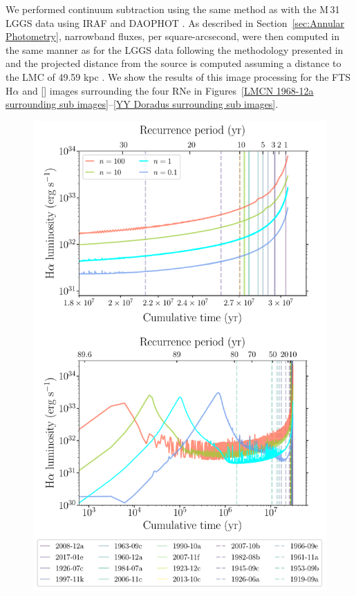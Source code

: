 \documentclass[fleqn,usenatbib]{mnras}
\begin{document}
We performed continuum subtraction using the same method as with the M\,31 LGGS data using IRAF \citep{1986SPIE..627..733T,1993ASPC...52..173T} and DAOPHOT \citep{1987PASP...99..191S}. As described in Section~\ref{sec:Annular Photometry}, narrowband fluxes, per square-arcsecond, were then computed in the same manner as for the LGGS data following the methodology presented in \citet{2010ApJS..187..275S} and the projected distance from the source is computed assuming a distance to the LMC of 49.59 kpc \citep{2019Natur.567..200P}. We show the results of this image processing for the FTS H$\alpha$ and [] images surrounding the four RNe in Figures~\ref{LMCN 1968-12a surrounding sub images}--\ref{YY Doradus surrounding sub images}.

\begin{figure}
\includegraphics[width=\columnwidth]{Figures/HalphaFluxEvolutionM31AllRNe_luminosity.pdf}

\end{figure}
\end{document}
